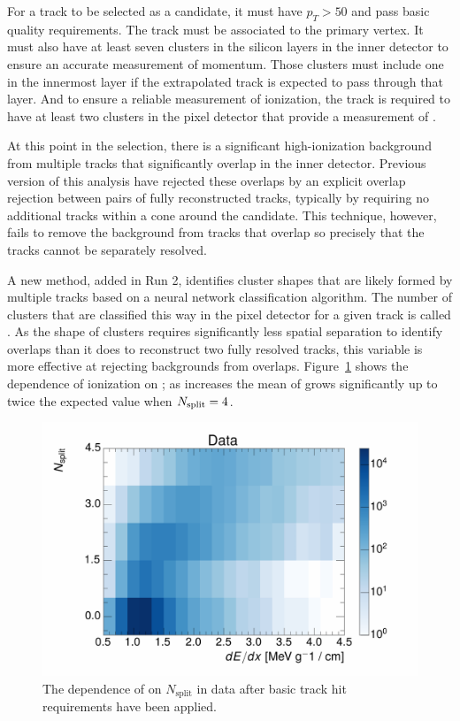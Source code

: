 For a track to be selected as a candidate, it must have $p_T > 50$ \GeV and pass basic quality requirements. 
The track must be associated to the primary vertex.
It must also have at least seven clusters in the silicon layers in the inner detector to ensure an accurate measurement of momentum.
Those clusters must include one in the innermost layer if the extrapolated track is expected to pass through that layer.
And to ensure a reliable measurement of ionization, the track is required to have at least two clusters in the pixel detector that provide a measurement of \dedx.

At this point in the selection, there is a significant high-ionization background from multiple tracks that significantly overlap in the inner detector. 
Previous version of this analysis have rejected these overlaps by an explicit overlap rejection between pairs of fully reconstructed tracks, typically by requiring no additional tracks within a cone around the candidate. 
This technique, however, fails to remove the background from tracks that overlap so precisely that the tracks cannot be separately resolved.

A new method, added in Run 2, identifies cluster shapes that are likely formed by multiple tracks based on a neural network classification algorithm. 
The number of clusters that are classified this way in the pixel detector for a given track is called \Nsplit.
As the shape of clusters requires significantly less spatial separation to identify overlaps than it does to reconstruct two fully resolved tracks, this variable is more effective at rejecting backgrounds from overlaps.
Figure~\ref{fig:dedx_nsplit} shows the dependence of ionization on \Nsplit; as \Nsplit increases the mean of \dedx grows significantly up to twice the expected value when $N_{\mathrm{split}} = 4$. 

\begin{figure}[h]
\centering
\includegraphics[width=\fullfig]{figures/dedx_nsplit_data.pdf}
\caption{The dependence of \dedx on $N_{\mathrm{split}}$ in data after basic track hit requirements have been applied.}
\label{fig:dedx_nsplit}
\end{figure}

